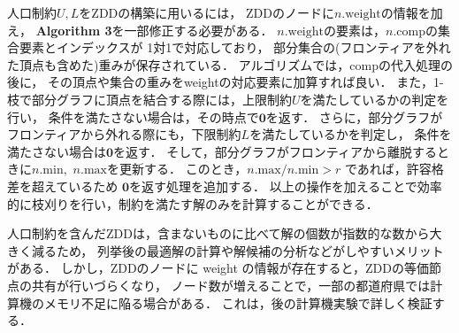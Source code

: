 人口制約$U,L$をZDDの構築に用いるには，
ZDDのノードに$n.\mathrm{weight}$の情報を加え，
\textbf{Algorithm 3}を一部修正する必要がある．
$n.\mathrm{weight}$の要素は，$n.\mathrm{comp}$の集合要素とインデックスが
1対1で対応しており，
部分集合の(フロンティアを外れた頂点も含めた)重みが保存されている．
アルゴリズムでは，compの代入処理の後に，
その頂点や集合の重みをweightの対応要素に加算すれば良い．
また，1-枝で部分グラフに頂点を結合する際には，上限制約$U$を満たしているかの判定を行い，
条件を満たさない場合は，その時点で$\textbf{0}$を返す．
さらに，部分グラフがフロンティアから外れる際にも，下限制約$L$を満たしているかを判定し，
条件を満たさない場合は$\textbf{0}$を返す．
そして，部分グラフがフロンティアから離脱するときに$n.\mathrm{min}, $ $n.\mathrm{max}$を更新する．
このとき，$n.\mathrm{max} / n.\mathrm{min} > r$ であれば，許容格差を超えているため
$\textbf{0}$を返す処理を追加する．
以上の操作を加えることで効率的に枝刈りを行い，制約を満たす解のみを計算することができる．

人口制約を含んだZDDは，含まないものに比べて解の個数が指数的な数から大きく減るため，
列挙後の最適解の計算や解候補の分析などがしやすいメリットがある．
しかし，ZDDのノードに weight の情報が存在すると，ZDDの等価節点の共有が行いづらくなり，
ノード数が増えることで，一部の都道府県では計算機のメモリ不足に陥る場合がある．
これは，後の計算機実験で詳しく検証する．